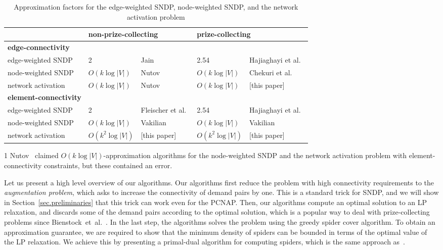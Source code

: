\documentclass[11pt]{article}
\begin{document}
\begin{table*}
\centering
\caption{Approximation factors for the edge-weighted SNDP, node-weighted SNDP, and 
the network activation problem}
\label{table.results}

\begin{threeparttable}
\begin{tabular}{lllll}
\toprule
 & \multicolumn{2}{l}{non-prize-collecting} & \multicolumn{2}{l}{prize-collecting}\\
\midrule
{\bf edge-connectivity}&&&&\\
edge-weighted SNDP & 2 & Jain~\cite{Jain01} & 2.54 & Hajiaghayi et al.~\cite{HajiaghayiKKN12} \\
node-weighted SNDP & 
	$O(k\log |V|)$ & Nutov~\cite{Nutov10node-weights} 
	& $O(k\log |V|)$ & Chekuri et al.~\cite{ChekuriEV12}\\
network activation & 
	$O(k\log |V|)$ & Nutov~\cite{Nutov13activation}
	& $O(k \log |V|)$ & [this paper]\\
\midrule
{\bf element-connectivity}&&&&\\
edge-weighted SNDP
	& 2 & Fleischer et al.~\cite{FleischerJW06}
	& 2.54 &Hajiaghayi et al.~\cite{HajiaghayiKKN12}\\
node-weighted SNDP
	& $O(k \log |V|)$ & Vakilian \cite{Vakilian13}\tnote{1}
	& $O(k\log |V|)$ & Vakilian \cite{Vakilian13}\\
network activation  
 & $O(k^2 \log |V|)$ & [this paper]\tnote{1}
 & $O(k^2 \log |V|)$ & [this paper]\\
\bottomrule
\end{tabular}
\begin{tablenotes}\footnotesize
\item[1] Nutov~\cite{Nutov12uncrossable,Nutov13activation} claimed $O(k \log |V|)$-approximation
algorithms for the node-weighted SNDP and the network activation problem with element-connectivity 
constraints, but these contained an error.
\end{tablenotes}
\end{threeparttable}
\end{table*}



Let us present a high level overview of our algorithms.
Our algorithms first reduce the problem with high connectivity requirements
to the \emph{augmentation problem},
which asks to increase the connectivity of demand pairs by one.
This is a standard trick for SNDP,
and we will show in Section~\ref{sec.preliminaries} that this trick can work
even for the PCNAP.
Then, our algorithms compute an optimal solution to an LP relaxation, and 
discards some of the demand pairs according to the optimal solution, 
which is a popular way to deal with prize-collecting problems
since Bienstock~et~al.~\cite{BienstockGSW93}.
In the last step, the algorithms solves the problem using the greedy spider cover algorithm.
To obtain an approximation guarantee, we are required to show that 
the minimum density of spiders can be bounded
in terms of the optimal value of the LP relaxation.
We achieve this by presenting a primal-dual algorithm for computing spiders,
which is the same approach as~\cite{ChekuriEV12,BateniHL13,Vakilian13}.
\end{document}

